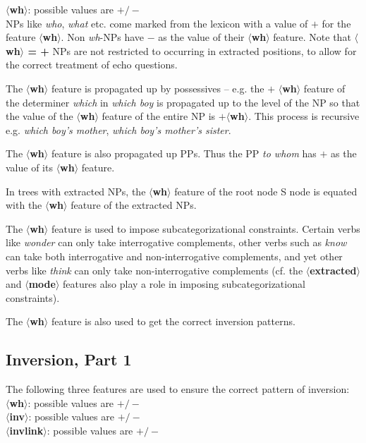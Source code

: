{\bf $\langle$wh$\rangle$}: possible values are {\bf $+/-$}\\ NPs like
{\em who}, {\em what} etc. come marked from the lexicon with a value
of {\bf $+$} for the feature {\bf $\langle$wh$\rangle$}.  Non {\em
wh}-NPs have {\bf $-$} as the value of their {\bf
$\langle$wh$\rangle$} feature. Note that {\bf $\langle$wh$\rangle$ = +
} NPs are not restricted to occurring in extracted positions, to allow
for the correct treatment of echo questions.

The {\bf $\langle$wh$\rangle$} feature is propagated up by possessives
-- e.g. the $+$ {\bf $\langle$wh$\rangle$} feature of the determiner
{\em which} in {\em which boy} is propagated up to the level of the NP
so that the value of the {\bf $\langle$wh$\rangle$} feature of the
entire NP is $+${\bf $\langle$wh$\rangle$}. This process is recursive
e.g. {\em which boy's mother}, {\em which boy's mother's sister}.

The {\bf $\langle$wh$\rangle$} feature
is also propagated up PPs. Thus the PP {\em to whom} has $+$ as the value of its 
{\bf $\langle$wh$\rangle$} feature. 

In trees with extracted NPs, the {\bf $\langle$wh$\rangle$} feature of the
root node S node is equated with the {\bf $\langle$wh$\rangle$} feature
of the extracted NPs. 

The {\bf $\langle$wh$\rangle$} feature is used to impose
subcategorizational constraints.
Certain verbs like {\em wonder} can
only take interrogative complements, other verbs such as {\em know}
can take both interrogative and non-interrogative complements, and yet
other verbs like {\em think} can only take non-interrogative
complements (cf. the {\bf $\langle$extracted$\rangle$} and {\bf
$\langle$mode$\rangle$} features also play a role in imposing 
subcategorizational constraints).

The {\bf $\langle$wh$\rangle$} feature is also used to get the correct
inversion patterns.


\subsection{Inversion, Part 1}
The following three features are used to ensure the correct pattern of
inversion:\\
{\bf $\langle$wh$\rangle$}: possible values are {\bf $+/-$}\\
{\bf $\langle$inv$\rangle$}: possible values are {\bf $+/-$}\\
{\bf $\langle$invlink$\rangle$}: possible values are {\bf $+/-$}

